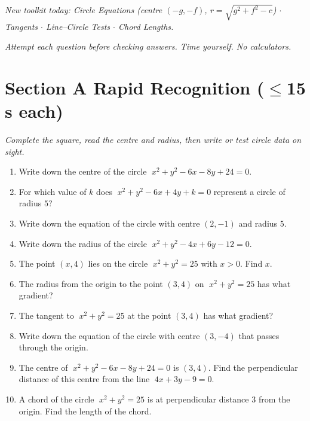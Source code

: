 \documentclass[11pt,a4paper]{article}
\begin{document}
\noindent\textit{New toolkit today: Circle Equations (centre $(-g,-f)$, $r=\sqrt{g^2+f^2-c}$) $\cdot$ Tangents $\cdot$ Line--Circle Tests $\cdot$ Chord Lengths.}

\vspace{2pt}
\noindent\textit{Attempt each question before checking answers. Time yourself. No calculators.}

\section*{Section A \quad Rapid Recognition \hfill{\normalfont\small($\leq$15 s each)}}

\noindent\textit{Complete the square, read the centre and radius, then write or test circle data on sight.}

\begin{enumerate}

\item Write down the centre of the circle $\;x^2 + y^2 - 6x - 8y + 24 = 0$.

\item For which value of $k$ does $\;x^2+y^2-6x+4y+k=0$ represent a circle of radius $5$?

\item Write down the equation of the circle with centre $(2,-1)$ and radius $5$.

\item Write down the radius of the circle $\;x^2 + y^2 - 4x + 6y - 12 = 0$.

\item The point $(x,4)$ lies on the circle $\;x^2 + y^2 = 25$ with $x > 0$. Find $x$.

\item The radius from the origin to the point $(3,4)$ on $\;x^2+y^2=25$ has what gradient?

\item The tangent to $\;x^2 + y^2 = 25$ at the point $(3,4)$ has what gradient?

\item Write down the equation of the circle with centre $(3,-4)$ that passes through the origin.

\item The centre of $\;x^2+y^2-6x-8y+24=0$ is $(3,4)$. Find the perpendicular distance of this centre from the line $\;4x + 3y - 9 = 0$.

\item A chord of the circle $\;x^2+y^2=25$ is at perpendicular distance $3$ from the origin. Find the length of the chord.

\end{enumerate}
\end{document}
